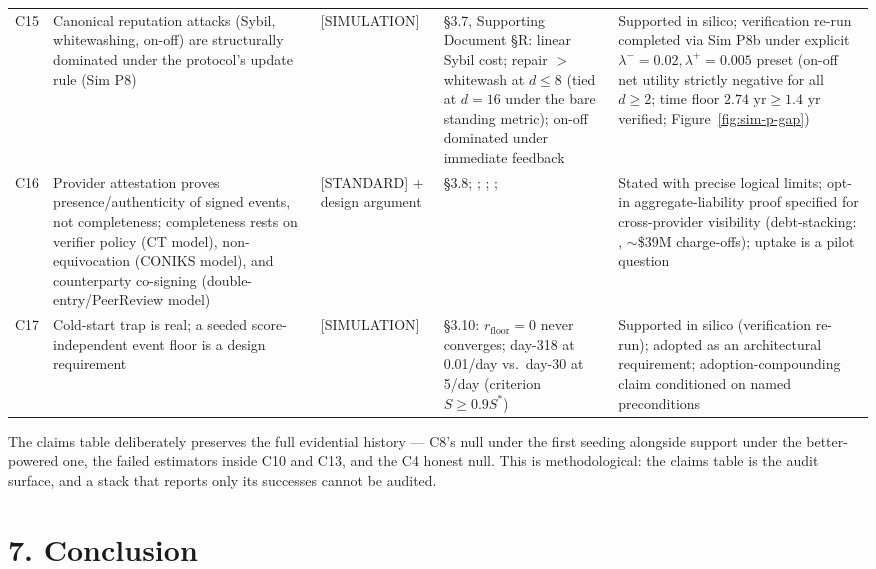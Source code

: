\documentclass[11pt,twocolumn]{article}
\begin{document}
\begin{table}[t]
\begin{tabular}{@{}l p{4.35cm} p{2.3cm} p{3.95cm} p{5.35cm}@{}}
C15 & Canonical reputation attacks (Sybil, whitewashing, on-off) are structurally dominated under the protocol's update rule (Sim P8) & [SIMULATION] & \S3.7, Supporting Document \S R: linear Sybil cost; repair $>$ whitewash at $d \leq 8$ (tied at $d = 16$ under the bare standing metric); on-off dominated under immediate feedback & Supported in silico; verification re-run completed via Sim P8b under explicit $\lambda^- = 0.02, \lambda^+ = 0.005$ preset (on-off net utility strictly negative for all $d \ge 2$; time floor $2.74\text{ yr} \ge 1.4\text{ yr}$ verified; Figure~\ref{fig:sim-p-gap}) \\
C16 & Provider attestation proves presence/authenticity of signed events, not completeness; completeness rests on verifier policy (CT model), non-equivocation (CONIKS model), and counterparty co-signing (double-entry/PeerReview model) & [STANDARD] + design argument & \S3.8; \citealp{rfc6962}; \citealp{melara2015}; \citealp{haeberlen2007}; \citealp{cfpb2024} & Stated with precise logical limits; opt-in aggregate-liability proof specified for cross-provider visibility (debt-stacking: \citealp{transunion2015}, $\sim$\$39M charge-offs); uptake is a pilot question \\
C17 & Cold-start trap is real; a seeded score-independent event floor is a design requirement & [SIMULATION] & \S3.10: $r_{\mathrm{floor}} = 0$ never converges; day-318 at 0.01/day vs.\ day-30 at 5/day (criterion $S \geq 0.9 S^*$) & Supported in silico (verification re-run); adopted as an architectural requirement; adoption-compounding claim conditioned on named preconditions \\
\bottomrule
\end{tabular}
\end{table}


The claims table deliberately preserves the full evidential history ---
C8's null under the first seeding alongside support under the better-powered
one, the failed estimators inside C10 and C13, and the C4 honest
null. This is methodological: the claims table is the audit surface, and a
stack that reports only its successes cannot be audited.


\FloatBarrier
\section*{7. Conclusion}
\end{document}
